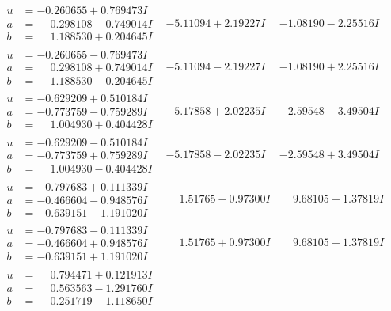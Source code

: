 \documentclass[1p]{elsarticle_modified}
\theoremstyle{definition}
\begin{document}
$$\begin{array}{c|c|c}
\begin{aligned}
u &= -0.260655 + 0.769473 I \\
a &= \phantom{-}0.298108 - 0.749014 I \\
b &= \phantom{-}1.188530 + 0.204645 I\end{aligned}
 & -5.11094 + 2.19227 I & -1.08190 - 2.25516 I \\ \hline\begin{aligned}
u &= -0.260655 - 0.769473 I \\
a &= \phantom{-}0.298108 + 0.749014 I \\
b &= \phantom{-}1.188530 - 0.204645 I\end{aligned}
 & -5.11094 - 2.19227 I & -1.08190 + 2.25516 I \\ \hline\begin{aligned}
u &= -0.629209 + 0.510184 I \\
a &= -0.773759 - 0.759289 I \\
b &= \phantom{-}1.004930 + 0.404428 I\end{aligned}
 & -5.17858 + 2.02235 I & -2.59548 - 3.49504 I \\ \hline\begin{aligned}
u &= -0.629209 - 0.510184 I \\
a &= -0.773759 + 0.759289 I \\
b &= \phantom{-}1.004930 - 0.404428 I\end{aligned}
 & -5.17858 - 2.02235 I & -2.59548 + 3.49504 I \\ \hline\begin{aligned}
u &= -0.797683 + 0.111339 I \\
a &= -0.466604 - 0.948576 I \\
b &= -0.639151 - 1.191020 I\end{aligned}
 & \phantom{-}1.51765 - 0.97300 I & \phantom{-}9.68105 - 1.37819 I \\ \hline\begin{aligned}
u &= -0.797683 - 0.111339 I \\
a &= -0.466604 + 0.948576 I \\
b &= -0.639151 + 1.191020 I\end{aligned}
 & \phantom{-}1.51765 + 0.97300 I & \phantom{-}9.68105 + 1.37819 I \\ \hline\begin{aligned}
u &= \phantom{-}0.794471 + 0.121913 I \\
a &= \phantom{-}0.563563 - 1.291760 I \\
b &= \phantom{-}0.251719 - 1.118650 I\end{aligned}

\end{array}$$
\end{document}
